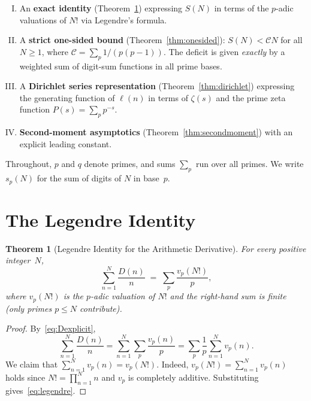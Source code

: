 \documentclass[11pt,a4paper]{amsart}
\theoremstyle{plain}
\newtheorem{theorem}{Theorem}[section]
\theoremstyle{definition}
\begin{document}
\begin{enumerate}[(I)]
\item An \textbf{exact identity} (Theorem~\ref{thm:legendre}) expressing 
$S(N)$ in terms of the $p$-adic valuations of $N!$ via Legendre's formula.

\item A \textbf{strict one-sided bound} (Theorem~\ref{thm:onesided}): 
$S(N) < \mathcal{C} N$ for all $N \ge 1$, where $\mathcal{C} = \sum_p 1/(p(p-1))$.  
The deficit is given \emph{exactly} by a weighted sum of digit-sum functions 
in all prime bases.

\item A \textbf{Dirichlet series representation} (Theorem~\ref{thm:dirichlet}) 
expressing the generating function of $\ell(n)$ in terms of $\zeta(s)$ and 
the prime zeta function $P(s) = \sum_p p^{-s}$.

\item \textbf{Second-moment asymptotics} (Theorem~\ref{thm:secondmoment}) 
with an explicit leading constant.
\end{enumerate}

Throughout, $p$ and $q$ denote primes, and sums $\sum_p$ run over all primes.
We write $s_p(N)$ for the sum of digits of $N$ in base~$p$.

\section{The Legendre Identity}

\begin{theorem}[Legendre Identity for the Arithmetic Derivative]\label{thm:legendre}
For every positive integer~$N$,
\begin{equation}\label{eq:legendre}
\sum_{n=1}^{N} \frac{D(n)}{n} \;=\; \sum_{p} \frac{v_p(N!)}{p},
\end{equation}
where $v_p(N!)$ is the $p$-adic valuation of $N!$ and the right-hand sum is 
finite (only primes $p \le N$ contribute).
\end{theorem}

\begin{proof}
By~\eqref{eq:Dexplicit},
\[
\sum_{n=1}^{N} \frac{D(n)}{n}
= \sum_{n=1}^{N} \sum_{p} \frac{v_p(n)}{p}
= \sum_{p} \frac{1}{p} \sum_{n=1}^{N} v_p(n).
\]
We claim that $\sum_{n=1}^{N} v_p(n) = v_p(N!)$.  Indeed, $v_p(N!) = \sum_{n=1}^N v_p(n)$ holds since $N! = \prod_{n=1}^N n$ and $v_p$ is completely additive.  Substituting gives~\eqref{eq:legendre}.
\end{proof}
\end{document}
